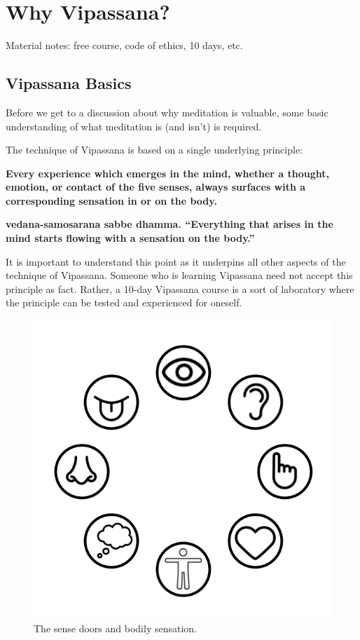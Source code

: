 \documentclass[a4paper, amsfonts, amssymb, amsmath, reprint, showkeys, nofootinbib, twoside]{revtex4-1}
\begin{document}
\section{Why Vipassana?}

Material notes: free course, code of ethics, 10 days, etc.

\subsection{Vipassana Basics}

Before we get to a discussion about why meditation is valuable, some basic
understanding of what meditation is (and isn't) is required.

The technique of Vipassana is based on a single underlying principle:

\vspace{1cm}
\textbf{Every experience which emerges in the mind, whether a thought, emotion, or
  contact of the five senses, always surfaces with a corresponding sensation in or on the body.}
\vspace{1cm}

\cite{hauke2018}

\textbf{vedana-samosarana sabbe dhamma. ``Everything
that arises in the mind starts flowing with a sensation
on the body.''} \cite{goenka1999discourses}

It is important to understand this point as it underpins all other aspects of the
technique of Vipassana. Someone who is learning Vipassana need not accept this
principle as fact. Rather, a 10-day Vipassana course is a sort of laboratory where the
principle can be tested and experienced for oneself.

\begin{figure}[H]
  \centering
  \includegraphics[width=0.8\linewidth]{images/sense-doors.png}
  \caption{The sense doors and bodily sensation. \cite{sense-icons}}
  \label{fig:sense-doors}
\end{figure}
\end{document}
